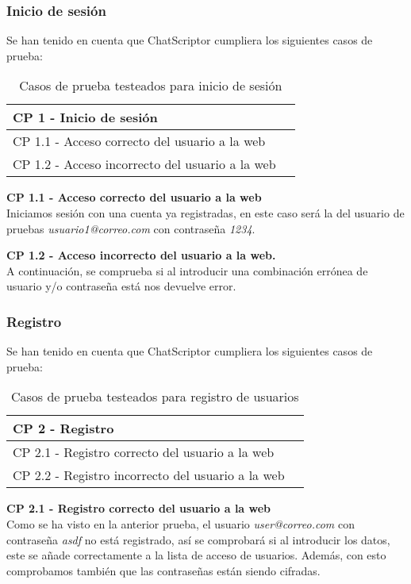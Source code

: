 \subsubsection{Inicio de sesión}
Se han tenido en cuenta que ChatScriptor cumpliera los siguientes casos de prueba:

\begin{table}[H]
\centering
\begin{tabular}{ll}
\toprule
CP 1 - Inicio de sesión   \\
\midrule
CP 1.1 - Acceso correcto del usuario a la web   \\
CP 1.2 - Acceso incorrecto del usuario a la web \\
\bottomrule
\end{tabular}
\caption{Casos de prueba testeados para inicio de sesión}
\end{table}

\textbf{CP 1.1 - Acceso correcto del usuario a la web} \\
Iniciamos sesión con una cuenta ya registradas, en este caso será la del usuario de pruebas \textit{usuario1@correo.com} con contraseña \textit{1234}.

\textbf{CP 1.2 - Acceso incorrecto del usuario a la web.} \\
A continuación, se comprueba si al introducir una combinación errónea de usuario y/o contraseña está nos devuelve error.

\subsubsection{Registro}
Se han tenido en cuenta que ChatScriptor cumpliera los siguientes casos de prueba:

\begin{table}[H]
\centering
\begin{tabular}{ll}
\toprule
CP 2 - Registro   \\
\midrule
CP 2.1 - Registro correcto del usuario a la web   \\
CP 2.2 - Registro incorrecto del usuario a la web \\
\bottomrule
\end{tabular}
\caption{Casos de prueba testeados para registro de usuarios}
\end{table}

\textbf{CP 2.1 - Registro correcto del usuario a la web} \\
Como se ha visto en la anterior prueba, el usuario \textit{user@correo.com} con contraseña \textit{asdf} no está registrado, así se comprobará si al introducir los datos, este se añade correctamente a la lista de acceso de usuarios.
Además, con esto comprobamos también que las contraseñas están siendo cifradas.

